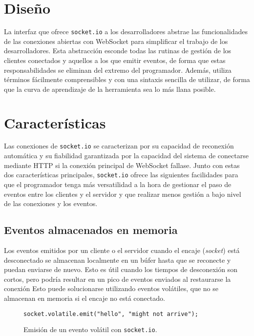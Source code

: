 \documentclass[runningheads]{llncs}
\begin{document}
\section{Diseño}

La interfaz que ofrece \texttt{socket.io} a los desarrolladores abstrae las funcionalidades de las conexiones abiertas con WebSocket para simplificar el trabajo de los desarrolladores.
Esta abstracción esconde todas las rutinas de gestión de los clientes conectados y aquellos a los que emitir eventos, de forma que estas responsabilidades se eliminan del extremo del programador.
Además, utiliza términos fácilmente comprensibles y con una sintaxis sencilla de utilizar, de forma que la curva de aprendizaje de la herramienta sea lo más llana posible.

\section{Características}

Las conexiones de \texttt{socket.io} se caracterizan por su capacidad de reconexión automática y su fiabilidad garantizada por la capacidad del sistema de conectarse mediante HTTP si la conexión principal de WebSocket fallase.
Junto con estas dos características principales, \texttt{socket.io} ofrece las siguientes facilidades para que el programador tenga más versatilidad a la hora de gestionar el paso de eventos entre los clientes y el servidor y que realizar menos gestión a bajo nivel de las conexiones y los eventos.

\subsection{Eventos almacenados en memoria}

Los eventos emitidos por un cliente o el servidor cuando el encaje (\textit{socket}) está desconectado se almacenan localmente en un búfer hasta que se reconecte y puedan enviarse de nuevo.
Esto es útil cuando los tiempos de desconexión son cortos, pero podría resultar en un pico de eventos enviados al restaurarse la conexión\cite{buffered-events}
Esto puede solucionarse utilizando eventos volátiles, que no se almacenan en memoria si el encaje no está conectado\cite{volatile-events}.

\begin{figure}[!ht]
\begin{lstlisting}
socket.volatile.emit("hello", "might not arrive");
\end{lstlisting}
\caption{Emisión de un evento volátil con \texttt{socket.io}.}
\end{figure}
\end{document}
